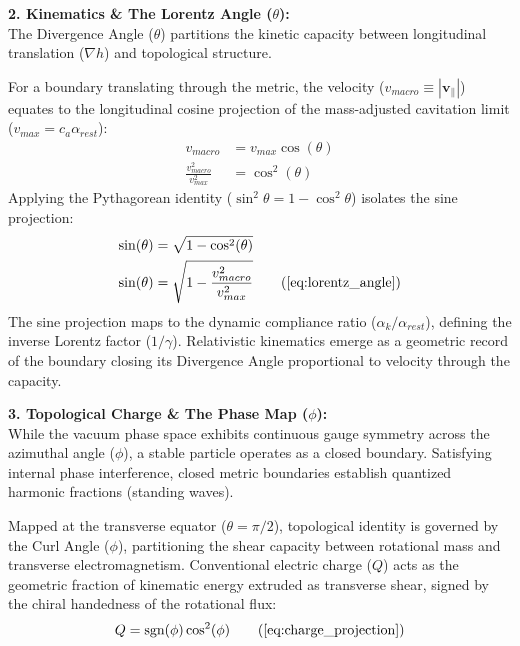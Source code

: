 \textbf{2. Kinematics \& The Lorentz Angle ($\theta$):} \\
The Divergence Angle ($\theta$) partitions the kinetic capacity between longitudinal translation ($\nabla h$) and topological structure. 

For a boundary translating through the metric, the velocity ($v_{macro} \equiv |\mathbf{v}_{\parallel}|$) equates to the longitudinal cosine projection of the mass-adjusted cavitation limit ($v_{max} = c_a \alpha_{rest}$): 
\begin{align}
    v_{macro} &= v_{max} \cos(\theta) \nonumber \\
    \frac{v_{macro}^2}{v_{max}^2} &= \cos^2(\theta) \nonumber
\end{align}
Applying the Pythagorean identity ($\sin^2\theta = 1 - \cos^2\theta$) isolates the sine projection:
\begin{align}
    \sin(\theta) &= \sqrt{1 - \cos^2(\theta)} \nonumber \\
    \sin(\theta) &= \sqrt{1 - \frac{v_{macro}^2}{v_{max}^2}} \tag{\ref{eq:lorentz_angle}} %
\end{align}
The sine projection maps to the dynamic compliance ratio ($\alpha_k / \alpha_{rest}$), defining the inverse Lorentz factor ($1/\gamma$). Relativistic kinematics emerge as a geometric record of the boundary closing its Divergence Angle proportional to velocity through the capacity. 

\vspace{0.2 cm}

\textbf{3. Topological Charge \& The Phase Map ($\phi$):} \\
While the vacuum phase space exhibits continuous gauge symmetry across the azimuthal angle ($\phi$), a stable particle operates as a closed boundary. Satisfying internal phase interference, closed metric boundaries establish quantized harmonic fractions (standing waves). 

Mapped at the transverse equator ($\theta = \pi/2$), topological identity is governed by the Curl Angle ($\phi$), partitioning the shear capacity between rotational mass and transverse electromagnetism. Conventional electric charge ($Q$) acts as the geometric fraction of kinematic energy extruded as transverse shear, signed by the chiral handedness of the rotational flux: 
\begin{equation}
    Q = \text{sgn}(\phi) \cos^2(\phi) \tag{\ref{eq:charge_projection}} 
\end{equation}

